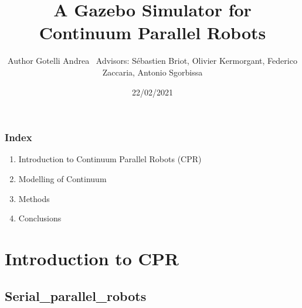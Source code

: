 \documentclass[compress]{thesisbeamer}
\title{A Gazebo Simulator for Continuum Parallel Robots}
\author[Gotelli Andrea]{Author Gotelli Andrea\newline ~ \newline \normalsize{Advisors: Sébastien Briot, Olivier Kermorgant, Federico Zaccaria, Antonio Sgorbissa}}
\date{22/02/2021}
\begin{document}
\MakeTitleNoFoot

\begin{frame}
	\frametitle{Index}
	\begin{enumerate}
		\item Introduction to Continuum Parallel Robots (CPR)
   		\item Modelling of Continuum
   		\item Methods
   		\item Conclusions
	\end{enumerate}	
\end{frame}

    
   	\section{Introduction to CPR}	
        \subsection{Serial_parallel_robots}
\end{document}
